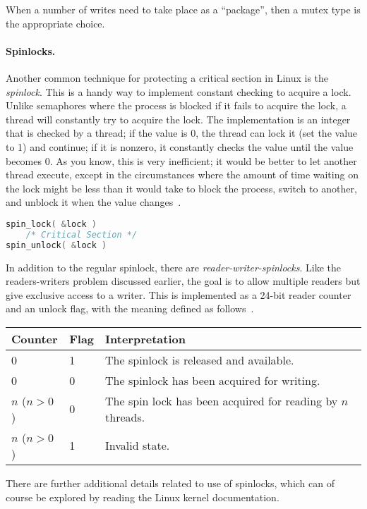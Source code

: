 When a number of writes need to take place as a ``package'', then a mutex type is the appropriate choice. 

\paragraph{Spinlocks.}
Another common technique for protecting a critical section in Linux is the \textit{spinlock}. This is a handy way to implement constant checking to acquire a lock. Unlike semaphores where the process is blocked if it fails to acquire the lock, a thread will constantly try to acquire the lock. The implementation is an integer that is checked by a thread; if the value is 0, the thread can lock it (set the value to 1) and continue; if it is nonzero, it constantly checks the value until the value becomes 0. As you know, this is very inefficient; it would be better to let another thread execute, except in the circumstances where the amount of time waiting on the lock might be less than it would take to block the process, switch to another, and unblock it when the value changes~\cite{osi}.

\begin{lstlisting}[language=C]
spin_lock( &lock )
    /* Critical Section */
spin_unlock( &lock )
\end{lstlisting}

In addition to the regular spinlock, there are \textit{reader-writer-spinlocks}. Like the readers-writers problem discussed earlier, the goal is to allow multiple readers but give exclusive access to a writer. This is implemented as a 24-bit reader counter and an unlock flag, with the meaning defined as follows~\cite{osi}.

\begin{center}
\begin{tabular}{l|l|l}
	\textbf{Counter} & \textbf{Flag} & \textbf{Interpretation}\\\hline
	0 & 1 & The spinlock is released and available. \\
	0 & 0 & The spinlock has been acquired for writing.\\
	$n$ ($n > 0$) & 0 & The spin lock has been acquired for reading by $n$ threads.\\
	$n$ ($n > 0$) & 1 & Invalid state.\\
\end{tabular}
\end{center}

There are further additional details related to use of spinlocks, which can of course be explored by reading the Linux kernel documentation.




